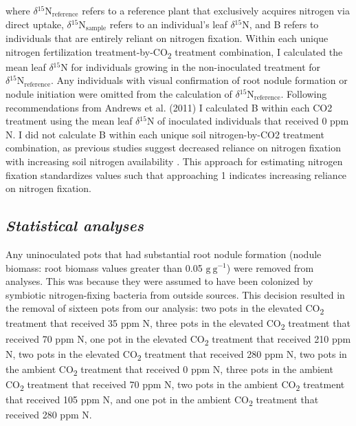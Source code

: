\noindent where $\delta\mathrm{^{15}{N}_{reference}}$ refers to a reference plant that exclusively acquires nitrogen via direct uptake, $\delta\mathrm{^{15}{N}_{sample}}$ refers to an individual’s leaf $\delta\mathrm{^{15}{N}}$, and B refers to individuals that are entirely reliant on nitrogen fixation. Within each unique nitrogen fertilization treatment-by-CO\textsubscript{2} treatment combination, I calculated the mean leaf $\delta\mathrm{^{15}{N}}$ for individuals growing in the non-inoculated treatment for $\delta\mathrm{^{15}{N}_{reference}}$. Any individuals with visual confirmation of root nodule formation or nodule initiation were omitted from the calculation of $\delta\mathrm{^{15}{N}_{reference}}$. Following recommendations from Andrews et al. (2011) I calculated B within each CO2 treatment using the mean leaf $\delta\mathrm{^{15}{N}}$ of inoculated individuals that received 0 ppm N. I did not calculate B within each unique soil nitrogen-by-CO2 treatment combination, as previous studies suggest decreased reliance on nitrogen fixation with increasing soil nitrogen availability . This approach for estimating nitrogen fixation standardizes values such that approaching 1 indicates increasing reliance on nitrogen fixation.

\subsection{\textit{Statistical analyses}}
Any uninoculated pots that had substantial root nodule formation (nodule biomass: root biomass values greater than 0.05 $\mathrm{g\ g^{-1}}$) were removed from analyses. This was because they were assumed to have been colonized by symbiotic nitrogen-fixing bacteria from outside sources. This decision resulted in the removal of sixteen pots from our analysis: two pots in the elevated CO\textsubscript{2} treatment that received 35 ppm N, three pots in the elevated CO\textsubscript{2} treatment that received 70 ppm N, one pot in the elevated CO\textsubscript{2} treatment that received 210 ppm N, two pots in the elevated CO\textsubscript{2} treatment that received 280 ppm N, two pots in the ambient CO\textsubscript{2} treatment that received 0 ppm N, three pots in the ambient CO\textsubscript{2} treatment that received 70 ppm N, two pots in the ambient CO\textsubscript{2} treatment that received 105 ppm N, and one pot in the ambient CO\textsubscript{2} treatment that received 280 ppm N.

